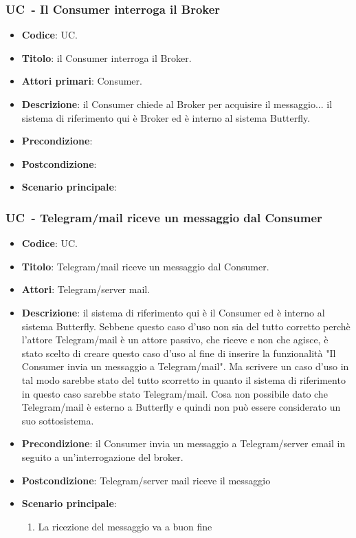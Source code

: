 \subsubsection{UC\theuccount\ - Il Consumer interroga il Broker}
	\begin{itemize}
		\item \textbf{Codice}: UC\theuccount.

		\item \textbf{Titolo}: il Consumer interroga il Broker.
		\item \textbf{Attori primari}: Consumer.
		\item \textbf{Descrizione}: il Consumer chiede al Broker per acquisire il messaggio... il sistema di riferimento qui è Broker ed è interno al sistema Butterfly.
		\item \textbf{Precondizione}:
		\item \textbf{Postcondizione}:
		\item \textbf{Scenario principale}: 
	\end{itemize}

\subsubsection{UC\theuccount\ - Telegram/mail riceve un messaggio dal Consumer}
	\begin{itemize}
		\item \textbf{Codice}: UC\theuccount.
		\item \textbf{Titolo}: Telegram/mail riceve un messaggio dal Consumer.
		\item \textbf{Attori}: Telegram/server mail.
		\item \textbf{Descrizione}: il sistema di riferimento qui è il Consumer ed è interno al sistema Butterfly.
		Sebbene questo caso d'uso non sia del tutto corretto perchè l'attore Telegram/mail è un attore passivo, che riceve e non che agisce, è stato scelto di creare questo caso d'uso al fine di inserire la funzionalità "Il Consumer invia un messaggio a Telegram/mail". Ma scrivere un caso d'uso in tal modo sarebbe stato del tutto scorretto in quanto il sistema di riferimento in questo caso sarebbe stato Telegram/mail. Cosa non possibile dato che Telegram/mail è esterno a Butterfly e quindi non può essere considerato un suo sottosistema.
		\item \textbf{Precondizione}: il Consumer invia un messaggio a Telegram/server email in seguito a un'interrogazione del broker.
		\item \textbf{Postcondizione}: Telegram/server mail riceve il messaggio
		\item \textbf{Scenario principale}:
		\begin{enumerate}
			\item La ricezione del messaggio va a buon fine
		\end{enumerate} 
	\end{itemize}

